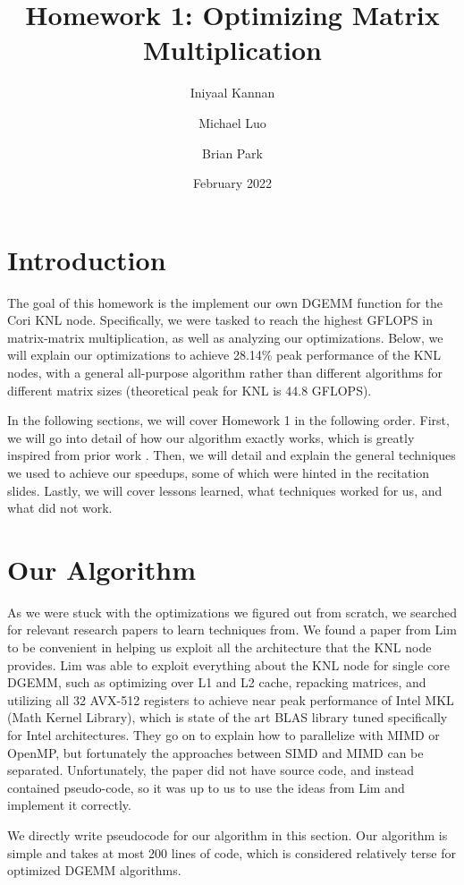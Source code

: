 \documentclass{article}
\title{Homework 1: Optimizing Matrix Multiplication}
\author{Iniyaal Kannan}
\author{Michael Luo}
\author{Brian Park}
\date{February 2022}
\affil{UC Berkeley, Computer Science 267}
\begin{document}
\maketitle

\section{Introduction}
The goal of this homework is the implement our own DGEMM function for the Cori KNL node. Specifically, we were tasked to reach the highest GFLOPS in matrix-matrix multiplication, as well as analyzing our optimizations. Below, we will explain our optimizations to achieve 28.14\% peak performance of the KNL nodes, with a general all-purpose algorithm rather than different algorithms for different matrix sizes (theoretical peak for KNL is 44.8 GFLOPS).

In the following sections, we will cover Homework 1 in the following order. First, we will go into detail of how our algorithm exactly works, which is greatly inspired from prior work \cite{10.1007/s10586-018-2810-y}. Then, we will detail and explain the general techniques we used to achieve our speedups, some of which were hinted in the recitation slides. Lastly, we will cover lessons learned, what techniques worked for us, and what did not work.

\section{Our Algorithm}
As we were stuck with the optimizations we figured out from scratch, we searched for relevant research papers to learn techniques from. We found a paper from Lim \cite{10.1007/s10586-018-2810-y} to be convenient in helping us exploit all the architecture that the KNL node provides. Lim was able to exploit everything about the KNL node for single core DGEMM, such as optimizing over L1 and L2 cache, repacking matrices, and utilizing all 32 AVX-512 registers to achieve near peak performance of Intel MKL (Math Kernel Library), which is state of the art BLAS library tuned specifically for Intel architectures. They go on to explain how to parallelize with MIMD or OpenMP, but fortunately the approaches between SIMD and MIMD can be separated. Unfortunately, the paper did not have source code, and instead contained pseudo-code, so it was up to us to use the ideas from Lim and implement it correctly.

We directly write pseudocode for our algorithm in this section. Our algorithm is simple and takes at most 200 lines of code, which is considered relatively terse for optimized DGEMM algorithms.
\end{document}
